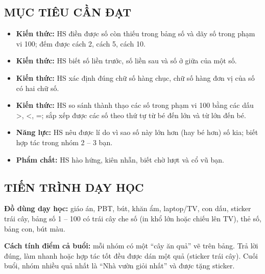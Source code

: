 \documentclass[../main.tex]{subfiles}
\begin{document}
\par\medskip
\begin{center}
\end{center}

\subsection{MỤC TIÊU CẦN ĐẠT}
\begin{itemize}
    \item \textbf{Kiến thức:} HS điền được số còn thiếu trong bảng số và dãy số trong phạm vi 100; đếm được cách 2, cách 5, cách 10.
    \item \textbf{Kiến thức:} HS biết số liền trước, số liền sau và số ở giữa của một số.
    \item \textbf{Kiến thức:} HS xác định đúng chữ số hàng chục, chữ số hàng đơn vị của số có hai chữ số.
    \item \textbf{Kiến thức:} HS so sánh thành thạo các số trong phạm vi 100 bằng các dấu \textgreater, \textless, =; sắp xếp được các số theo thứ tự từ bé đến lớn và từ lớn đến bé.
    \item \textbf{Năng lực:} HS nêu được lí do vì sao số này lớn hơn (hay bé hơn) số kia; biết hợp tác trong nhóm 2 -- 3 bạn.
    \item \textbf{Phẩm chất:} HS hào hứng, kiên nhẫn, biết chờ lượt và cổ vũ bạn.
\end{itemize}

\subsection{TIẾN TRÌNH DẠY HỌC}
\textbf{Đồ dùng dạy học:} giáo án, PBT, bút, khăn ẩm, laptop/TV, con dấu, sticker trái cây, bảng số 1 -- 100 có trái cây che số (in khổ lớn hoặc chiếu lên TV), thẻ số, bảng con, bút màu.

\begin{luuy}
    \textbf{Cách tính điểm cả buổi:} mỗi nhóm có một “cây ăn quả” vẽ trên bảng. Trả lời đúng, làm nhanh hoặc hợp tác tốt đều được dán một quả (sticker trái cây). Cuối buổi, nhóm nhiều quả nhất là “Nhà vườn giỏi nhất” và được tặng sticker.
\end{luuy}
\end{document}
